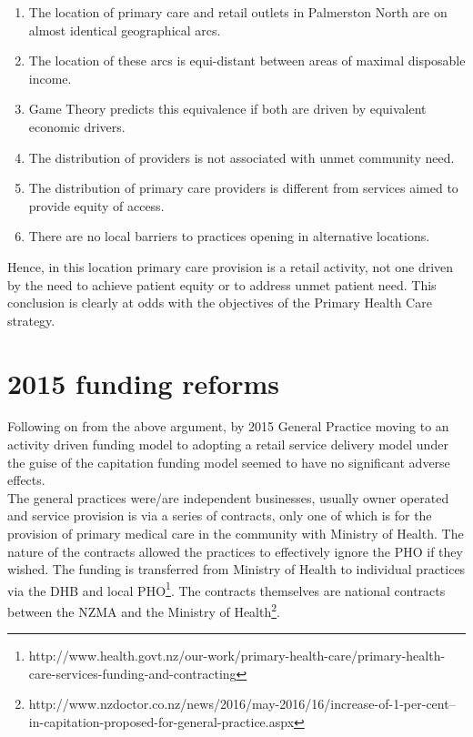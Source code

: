 \documentclass[11pt,a4paper]{article}
\begin{document}
\begin{enumerate}
\item The location of primary care and retail outlets in Palmerston North are on almost identical geographical arcs.
\item The location of these arcs is equi-distant between areas of maximal disposable income.
\item Game Theory predicts this equivalence if both are driven by equivalent economic drivers.
\item The distribution of providers is not associated with unmet community need.
\item The distribution of primary care providers is different from services aimed to provide equity of access.
\item There are no local barriers to practices opening in alternative locations.
\end{enumerate}

Hence, in this location primary care provision is a retail activity, not one driven by the need to achieve patient equity or to address unmet patient need. This conclusion is clearly at odds with the objectives of the Primary Health Care strategy.

\pagebreak
\section{2015 funding reforms}
Following on from the above argument, by 2015 General Practice moving to an activity driven funding model to adopting a retail service delivery model under the guise of the capitation funding model seemed to have no significant adverse effects.\\

The general practices were/are independent businesses, usually owner operated and service provision is via a series of contracts, only one of which is for the provision of primary medical care in the community with Ministry of Health. The nature of the contracts allowed the practices to effectively ignore the PHO if they wished. The funding is transferred from Ministry of Health to individual practices via the DHB and local PHO\footnote{http://www.health.govt.nz/our-work/primary-health-care/primary-health-care-services-funding-and-contracting}. The contracts themselves are national contracts between the NZMA and the Ministry of Health\footnote{http://www.nzdoctor.co.nz/news/2016/may-2016/16/increase-of-1-per-cent--in-capitation-proposed-for-general-practice.aspx}.\\
\end{document}
